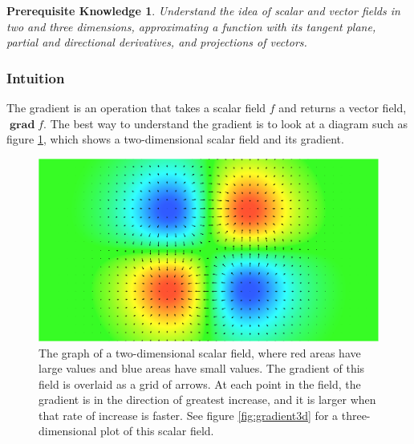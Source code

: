 \documentclass{myarticle}
\DeclareMathOperator{\grad}{\mathbf{grad}}
\theoremstyle{nospace}
\newtheorem*{oldprereq}{Prerequisite Knowledge}
\newenvironment{prereq}{\begin{mdframed}\begin{oldprereq}}{\end{oldprereq}\end{mdframed}}
\newtheorem{old series theorem}{Theorem}
\newenvironment{series theorem}{\begin{mdframed}\begin{old series theorem}}{\end{old series theorem}\end{mdframed}}
\begin{document}
\begin{prereq} Understand the idea of scalar and vector fields in two and three dimensions, approximating a function with its tangent plane, partial and directional derivatives, and projections of vectors. \end{prereq}

\subsubsection{Intuition} \label{sec:gradient intuition}

The gradient is an operation that takes a scalar field $f$ and returns a vector field, $\grad f$. The best way to understand the gradient is to look at a diagram such as figure \ref{fig:gradient2d}, which shows a two-dimensional scalar field and its gradient.

\begin{figure}[htb!] \centering

\includegraphics[width=12cm]{data/gradient2d.pdf}

\caption{The graph of a two-dimensional scalar field, where red areas have large values and blue areas have small values. The gradient of this field is overlaid as a grid of arrows. At each point in the field, the gradient is in the direction of greatest increase, and it is larger when that rate of increase is faster. See figure \ref{fig:gradient3d} for a three-dimensional plot of this scalar field.}
\label{fig:gradient2d}
\end{figure}
\end{document}
